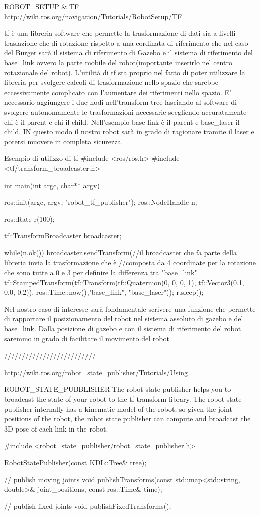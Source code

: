 ROBOT_SETUP & TF
http://wiki.ros.org/navigation/Tutorials/RobotSetup/TF

tf è una libreria software che permette la trasformazione di dati sia a livelli traslazione che di rotazione rispetto a una cordinata di riferimento che nel caso del Burger sarà il sistema di riferimento di Gazebo e il sistema di riferimento del base_link ovvero la parte mobile del robot(importante inserirlo nel centro rotazionale del robot).
L'utilità di tf sta proprio nel fatto di poter utilizzare la libreria per svolgere calcoli di trasformazione nello spazio che sarebbe eccessivamente complicato con l'aumentare dei riferimenti nello spazio. E' necessario aggiungere i due nodi nell'transform tree lasciando al software di svolgere autonomamente le trasformazioni necessarie scegliendo accuratamente chi è il parent e chi il child. Nell'esempio base link è il parent e base_laser il child. IN questo modo il nostro robot sarà in grado di ragionare tramite il laser e potersi muovere in completa sicurezza.


Esempio di utilizzo di tf
#include <ros/ros.h>
#include <tf/transform_broadcaster.h>

int main(int argc, char** argv){
  ros::init(argc, argv, "robot_tf_publisher");
  ros::NodeHandle n;

  ros::Rate r(100);

  tf::TransformBroadcaster broadcaster;

  while(n.ok()){
    broadcaster.sendTransform(//il broadcaster che fa parte della libreria invia la trasformazione che è
    //composta da 4 coordinate per la rotazione che sono tutte a 0 e 3 per definire la differenza tra "base_link"
      tf::StampedTransform(tf::Transform(tf::Quaternion(0, 0, 0, 1), 
      									 tf::Vector3(0.1, 0.0, 0.2)),
          								 ros::Time::now(),"base_link", "base_laser"));
    r.sleep();
  }
}

Nel nostro caso di interesse sarà fondamentale scrivere una funzione che permette di rapportare il posizionamento del robot nel sistema assoluto di gazebo e del base_link. Dalla posizione di gazebo e con il sistema di riferimento del robot saremmo in grado di facilitare il movimento del robot.

//////////////////////////

http://wiki.ros.org/robot_state_publisher/Tutorials/Using%

ROBOT_STATE_PUBBLISHER
The robot state publisher helps you to broadcast the state of your robot to the tf transform library. The robot state publisher internally has a kinematic model of the robot; so given the joint positions of the robot, the robot state publisher can compute and broadcast the 3D pose of each link in the robot. 

  #include <robot_state_publisher/robot_state_publisher.h>
  
  RobotStatePublisher(const KDL::Tree& tree);
    
      // publish moving joints
  void publishTransforms(const std::map<std::string, double>& joint_positions,
                         const ros::Time& time);

  // publish fixed joints
  void publishFixedTransforms();